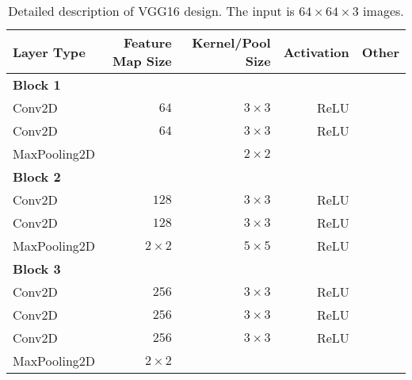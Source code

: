 \begin{table}[]
	\centering
	\caption{Detailed description of VGG16 design. The input is $64\times64\times3$ images.}
	\label{tab:vgg16}
	\begin{tabular}{lrrrr}
		\textbf{Layer Type}     & \textbf{Feature Map Size} & \textbf{Kernel/Pool Size} & \textbf{Activation} & \textbf{Other} \\ \hline
		\textbf{Block 1}        &                           &                           &                     &                \\
		\rowcolor{lightGrey}  
		Conv2D                  & $64$                      & $3\times3$                & ReLU                &                \\
		Conv2D                  & $64$                      & $3\times3$                & ReLU                &                \\
		\rowcolor{lightGrey} 
		MaxPooling2D            &                           & $2\times2$                &                     &                \\
		\textbf{Block 2}        &                           &                           &                     &                \\
		\rowcolor{lightGrey}  
		Conv2D                  & $128$                     & $3\times3$                & ReLU                &                \\
		Conv2D                  & $128$                     & $3\times3$                & ReLU                &                \\
		\rowcolor{lightGrey}  
		MaxPooling2D            & $2\times2$                & $5\times5$                & ReLU                &                \\
		\textbf{Block 3}        &                           &                           &                     &                \\
		\rowcolor{lightGrey}  
		Conv2D                  & $256$                     & $3\times3$                & ReLU                &                \\
		Conv2D                  & $256$                     & $3\times3$                & ReLU                &                \\
		\rowcolor[HTML]{EFEFEF} 
		Conv2D                  & $256$                     & $3\times3$                & ReLU                &                \\
		MaxPooling2D            & $2\times2$                &                           &                     &                \\

\end{tabular}
\end{table}
